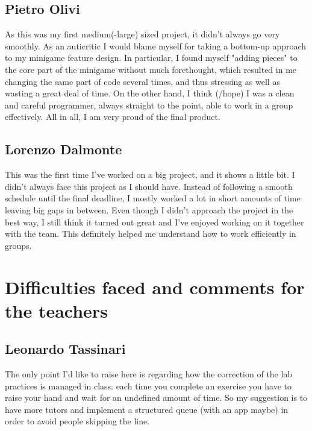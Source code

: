\documentclass[a4paper,12pt]{report}
\begin{document}
\subsection*{Pietro Olivi}
As this was my first medium(-large) sized project, it didn't always go very smoothly. As an auticritic I would blame myself for taking a bottom-up approach to my minigame 
feature design. In particular, I found myself "adding pieces" to the core part of the minigame without much forethought, which resulted in me changing the same part 
of code several times, and thus stressing as well as wasting a great deal of time. On the other hand, I think (/hope) I was a clean and careful programmer, always 
straight to the point, able to work in a group effectively. All in all, I am very proud of the final product.
\subsection*{Lorenzo Dalmonte}
This was the first time I've worked on a big project, and it shows a little bit. I didn't always face this project as I should have. Instead of following a smooth schedule
until the final deadline, I mostly worked a lot in short amounts of time leaving big gaps in between. Even though I didn't approach the project in the best way, I still think
it turned out great and I've enjoyed working on it together with the team. This definitely helped me understand how to work efficiently in groups.

\section{Difficulties faced and comments for the teachers}
\subsection*{Leonardo Tassinari}
The only point I'd like to raise here is regarding how the correction of the lab practices is managed in class: each time you complete an exercise you have to raise your hand and wait for an undefined amount of time.
So my suggestion is to have more tutors and implement a structured queue (with an app maybe) in order to avoid people skipping the line.
\end{document}
